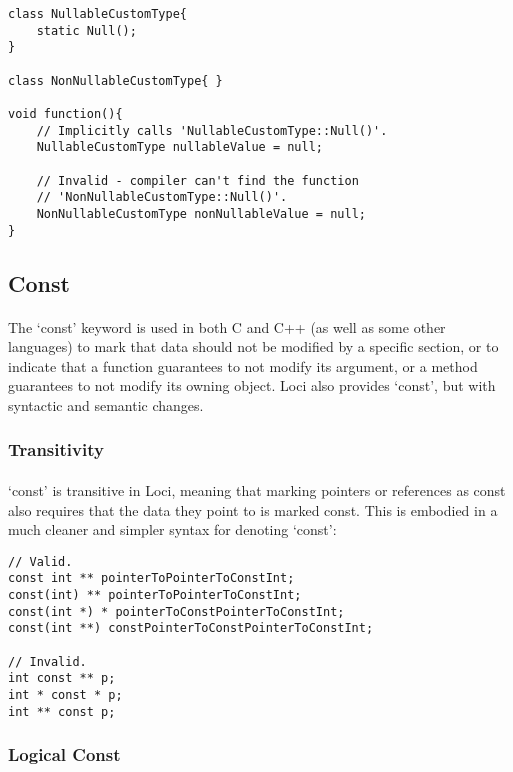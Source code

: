 \documentclass[12pt,twoside,notitlepage]{report}
\begin{document}
\begin{lstlisting}
class NullableCustomType{
	static Null();
}

class NonNullableCustomType{ }

void function(){
	// Implicitly calls 'NullableCustomType::Null()'.
	NullableCustomType nullableValue = null;
	
	// Invalid - compiler can't find the function
	// 'NonNullableCustomType::Null()'.
	NonNullableCustomType nonNullableValue = null;
}
\end{lstlisting}

\clearpage

\subsection{Const}

\paragraph{}
The `const' keyword is used in both C and C++ (as well as some other languages) to mark that data should not be modified by a specific section, or to indicate that a function guarantees to not modify its argument, or a method guarantees to not modify its owning object. Loci also provides `const', but with syntactic and semantic changes.

\subsubsection{Transitivity}

\paragraph{}
`const' is transitive in Loci, meaning that marking pointers or references as const also requires that the data they point to is marked const. This is embodied in a much cleaner and simpler syntax for denoting `const':

\begin{lstlisting}
// Valid.
const int ** pointerToPointerToConstInt;
const(int) ** pointerToPointerToConstInt;
const(int *) * pointerToConstPointerToConstInt;
const(int **) constPointerToConstPointerToConstInt;

// Invalid.
int const ** p;
int * const * p;
int ** const p;
\end{lstlisting}

\subsubsection{Logical Const}
\end{document}
